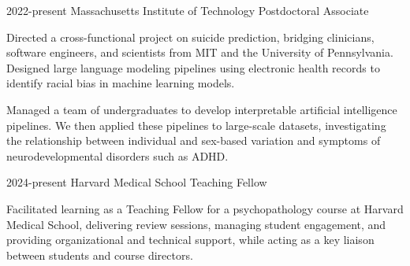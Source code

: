 
\begin{cventries}

  \cventry 
    {2022-present} %
    {Massachusetts Institute of Technology}
    {Postdoctoral Associate} %
    {} %
    {
      \begin{cvitems} %
        \item {Directed a cross-functional project on suicide prediction, bridging clinicians, software engineers, and scientists from MIT and the University of Pennsylvania. Designed large language modeling pipelines using electronic health records to identify racial bias in machine learning models.}
        \item {Managed a team of undergraduates to develop interpretable artificial intelligence pipelines. We then applied these pipelines to large-scale datasets, investigating the relationship between individual and sex-based variation and symptoms of neurodevelopmental disorders such as ADHD.}
      \end{cvitems}
    }

  \cventry 
    {2024-present} %
    {Harvard Medical School}
    {Teaching Fellow} %
    {} %
    {
      \begin{cvitems} %
        \item {Facilitated learning as a Teaching Fellow for a psychopathology course at Harvard Medical School, delivering review sessions, managing student engagement, and providing organizational and technical support, while acting as a key liaison between students and course directors.}
      \end{cvitems}
    }


\end{cventries}
